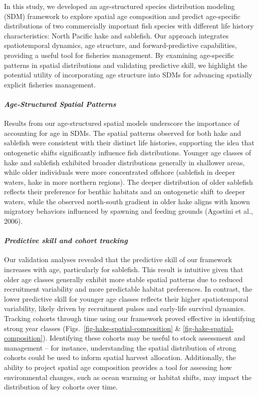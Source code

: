 \documentclass[
]{article}
\let\oldparagraph\paragraph
\renewcommand{\paragraph}[1]{\oldparagraph{#1}\mbox{}}
\begin{document}
In this study, we developed an age-structured species distribution
modeling (SDM) framework to explore spatial age composition and predict
age-specific distributions of two commercially important fish species
with different life history characteristics: North Pacific hake and
sablefish. Our approach integrates spatiotemporal dynamics, age
structure, and forward-predictive capabilities, providing a useful tool
for fisheries management. By examining age-specific patterns in spatial
distributions and validating predictive skill, we highlight the
potential utility of incorporating age structure into SDMs for advancing
spatially explicit fisheries management.

\paragraph{\texorpdfstring{\emph{Age-Structured Spatial
Patterns}}{Age-Structured Spatial Patterns}}\label{age-structured-spatial-patterns}

Results from our age-structured spatial models underscore the importance
of accounting for age in SDMs. The spatial patterns observed for both
hake and sablefish were consistent with their distinct life histories,
supporting the idea that ontogenetic shifts significantly influence fish
distributions. Younger age classes of hake and sablefish exhibited
broader distributions generally in shallower areas, while older
individuals were more concentrated offshore (sablefish in deeper waters,
hake in more northern regions). The deeper distribution of older
sablefish reflects their preference for benthic habitats and an
ontogenetic shift to deeper waters, while the observed north-south
gradient in older hake aligns with known migratory behaviors influenced
by spawning and feeding grounds (Agostini et al., 2006).

\paragraph{\texorpdfstring{\emph{Predictive skill and cohort
tracking}}{Predictive skill and cohort tracking}}\label{predictive-skill-and-cohort-tracking}

Our validation analyses revealed that the predictive skill of our
framework increases with age, particularly for sablefish. This result is
intuitive given that older age classes generally exhibit more stable
spatial patterns due to reduced recruitment variability and more
predictable habitat preferences. In contrast, the lower predictive skill
for younger age classes reflects their higher spatiotemporal
variability, likely driven by recruitment pulses and early-life survival
dynamics. Tracking cohorts through time using our framework proved
effective in identifying strong year classes
(Figs.~\ref{fig-hake-spatial-composition} \&
\ref{fig-hake-spatial-composition}). Identifying these cohorts may be
useful to stock assessment and management -- for instance, understanding
the spatial distribution of strong cohorts could be used to inform
spatial harvest allocation. Additionally, the ability to project spatial
age composition provides a tool for assessing how environmental changes,
such as ocean warming or habitat shifts, may impact the distribution of
key cohorts over time.
\end{document}

